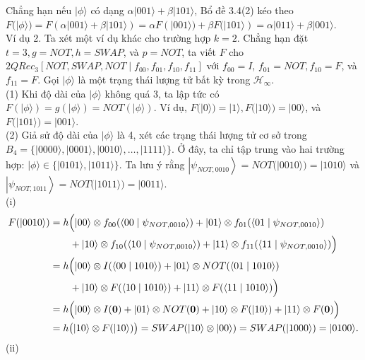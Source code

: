 \documentclass[10pt]{article}
\begin{document}
Chẳng hạn nếu $|\phi\rangle$ có dạng $\alpha|001\rangle+\beta|101\rangle$, Bổ đề 3.4(2) kéo theo $F(|\phi\rangle)=F(\alpha|001\rangle+\beta|101\rangle)= \alpha F(|001\rangle)+\beta F(|101\rangle)=\alpha|011\rangle+\beta|001\rangle$.\\
Ví dụ 2. Ta xét một ví dụ khác cho trường hợp $k=2$. Chẳng hạn đặt $t=3, g=N O T, h=S W A P$, và $p=N O T$, ta viết $F$ cho $2 Q R e c_{3}\left[N O T, S W A P, N O T \mid f_{00}, f_{01}, f_{10}, f_{11}\right]$ với $f_{00}=I$, $f_{01}=N O T, f_{10}=F$, và $f_{11}=F$. Gọi $|\phi\rangle$ là một trạng thái lượng tử bất kỳ trong $\mathcal{H}_{\infty}$.\\
(1) Khi độ dài của $|\phi\rangle$ không quá 3, ta lập tức có $F(|\phi\rangle)=g(|\phi\rangle)=N O T(|\phi\rangle)$. Ví dụ, $F(|0\rangle)=|1\rangle, F(|10\rangle)=|00\rangle$, và $F(|101\rangle)=|001\rangle$.\\
(2) Giả sử độ dài của $|\phi\rangle$ là 4, xét các trạng thái lượng tử cơ sở trong $B_{4}= \{|0000\rangle,|0001\rangle,|0010\rangle, \ldots,|1111\rangle\}$. Ở đây, ta chỉ tập trung vào hai trường hợp: $|\phi\rangle \in\{|0101\rangle,|1011\rangle\}$. Ta lưu ý rằng $\left|\psi_{N O T, 0010}\right\rangle=N O T(|0010\rangle)=|1010\rangle$ và $\left|\psi_{N O T, 1011}\right\rangle=N O T(|1011\rangle)=|0011\rangle$.\\
(i)
\[
\begin{aligned}
F(|0010\rangle)
&= h\Bigl(|00\rangle \otimes f_{00}(\langle 00 \mid \psi_{N O T, 0010}\rangle)
 + |01\rangle \otimes f_{01}(\langle 01 \mid \psi_{N O T, 0010}\rangle) \\
&\qquad + |10\rangle \otimes f_{10}(\langle 10 \mid \psi_{N O T, 0010}\rangle)
 + |11\rangle \otimes f_{11}(\langle 11 \mid \psi_{N O T, 0010}\rangle)\Bigr) \\
&= h\Bigl(|00\rangle \otimes I(\langle 00 \mid 1010\rangle)
 + |01\rangle \otimes N O T(\langle 01 \mid 1010\rangle) \\
&\qquad + |10\rangle \otimes F(\langle 10 \mid 1010\rangle)
 + |11\rangle \otimes F(\langle 11 \mid 1010\rangle)\Bigr) \\
&= h\Bigl(|00\rangle \otimes I(\mathbf{0}) + |01\rangle \otimes N O T(\mathbf{0})
 + |10\rangle \otimes F(|10\rangle) + |11\rangle \otimes F(\mathbf{0})\Bigr) \\
&= h\bigl(|10\rangle \otimes F(|10\rangle)\bigr)
 = S W A P(|10\rangle \otimes |00\rangle)=S W A P(|1000\rangle)=|0100\rangle.
\end{aligned}
\]
(ii)
\end{document}
